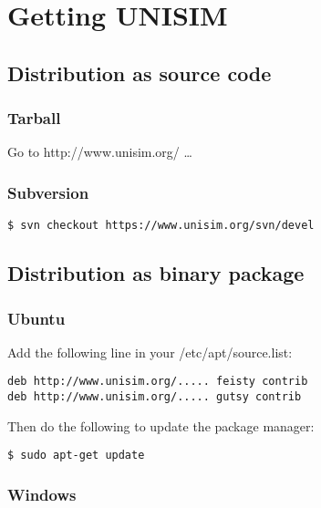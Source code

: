 \section{Getting UNISIM}
\label{getting_unisim}

\subsection{Distribution as source code}
\label{distribution_as_source_code}

\subsubsection{Tarball}
\label{distribution_as_source_code_tarball}

Go to http://www.unisim.org/ \ldots

\subsubsection{Subversion}
\label{distribution_as_source_code_subversion}

\begin{verbatim}
$ svn checkout https://www.unisim.org/svn/devel
\end{verbatim}

\subsection{Distribution as binary package}
\label{distribution_as_binary_package}

\subsubsection{Ubuntu}
\label{distribution_as_binary_package_ubuntu}

Add the following line in your /etc/apt/source.list:
\begin{verbatim}
deb http://www.unisim.org/..... feisty contrib
deb http://www.unisim.org/..... gutsy contrib
\end{verbatim}

Then do the following to update the package manager:
\begin{verbatim}
$ sudo apt-get update
\end{verbatim}

\subsubsection{Windows}
\label{distribution_as_binary_package_windows}

